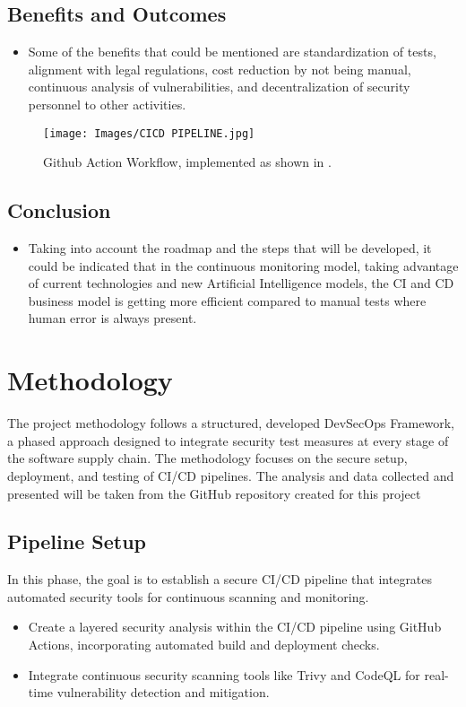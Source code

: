 \documentclass[conference]{IEEEtran}
\begin{document}
\subsection{Benefits and Outcomes}
\begin{itemize}
    \item 
    Some of the benefits that could be mentioned are standardization of tests, alignment with legal regulations, cost reduction by not being manual, continuous analysis of vulnerabilities, and decentralization of security personnel to other activities.
\end{itemize}

\begin{figure}[h!] 
    \centering 
    \texttt{[image: Images/CICD PIPELINE.jpg]} 
    \caption{Github Action Workflow, implemented as shown in \cite{devsecops}.} 
    \label{fig:CICD.yaml} 
\end{figure}

 \subsection{Conclusion}
\begin{itemize}
    \item 
    Taking into account the roadmap and the steps that will be developed, it could be indicated that in the continuous monitoring model, taking advantage of current technologies and new Artificial Intelligence models, the CI and CD business model is getting more efficient compared to manual tests where human error is always present.
\end{itemize}

\section{Methodology}
The project methodology follows a structured, developed DevSecOps Framework, a phased approach designed to integrate security test measures at every stage of the software supply chain. The methodology focuses on the secure setup, deployment, and testing of CI/CD pipelines.
The analysis and data collected and presented will be taken from the GitHub repository created for this project \cite{devsecops}

\subsection{Pipeline Setup}
In this phase, the goal is to establish a secure CI/CD pipeline that integrates automated security tools for continuous scanning and monitoring.
\begin{itemize}
    \item Create a layered security analysis within the CI/CD pipeline using GitHub Actions, incorporating automated build and deployment checks.
    \item Integrate continuous security scanning tools like Trivy and CodeQL for real-time vulnerability detection and mitigation.
\end{itemize}
\end{document}
